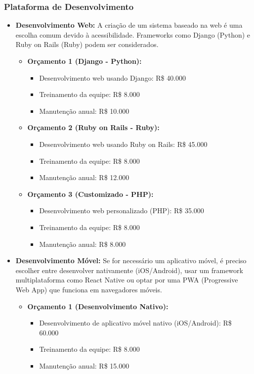 	\subsubsection{Plataforma de Desenvolvimento}
	\begin{itemize}
		\item \textbf{Desenvolvimento Web:} A criação de um sistema baseado na web é uma escolha comum devido à acessibilidade. Frameworks como Django (Python) e Ruby on Rails (Ruby) podem ser considerados.
		
		\begin{itemize}
			\item \textbf{Orçamento 1 (Django - Python):}
			\begin{itemize}
				\item Desenvolvimento web usando Django: R\$ 40.000
				\item Treinamento da equipe: R\$ 8.000
				\item Manutenção anual: R\$ 10.000
			\end{itemize}
			
			\item \textbf{Orçamento 2 (Ruby on Rails - Ruby):}
			\begin{itemize}
				\item Desenvolvimento web usando Ruby on Rails: R\$ 45.000
				\item Treinamento da equipe: R\$ 8.000
				\item Manutenção anual: R\$ 12.000
			\end{itemize}
			
			\item \textbf{Orçamento 3 (Customizado - PHP):}
			\begin{itemize}
				\item Desenvolvimento web personalizado (PHP): R\$ 35.000
				\item Treinamento da equipe: R\$ 8.000
				\item Manutenção anual: R\$ 8.000
			\end{itemize}
		\end{itemize}
		
		\item \textbf{Desenvolvimento Móvel:} Se for necessário um aplicativo móvel, é preciso escolher entre desenvolver nativamente (iOS/Android), usar um framework multiplataforma como React Native ou optar por uma PWA (Progressive Web App) que funciona em navegadores móveis.
		
		\begin{itemize}
			\item \textbf{Orçamento 1 (Desenvolvimento Nativo):}
			\begin{itemize}
				\item Desenvolvimento de aplicativo móvel nativo (iOS/Android): R\$ 60.000
				\item Treinamento da equipe: R\$ 8.000
				\item Manutenção anual: R\$ 15.000
			\end{itemize}
			

\end{itemize}
\end{itemize}
